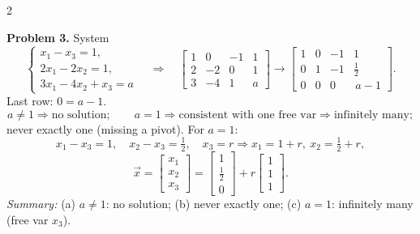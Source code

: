 \documentclass[8pt]{extarticle}
\begin{document}
\begin{multicols}{2}
\begin{tcolorbox}[title=Problems 2 and 3 — Explanations and Solutions, fontupper=\scriptsize]
\medskip
\textbf{Problem 3.}\; System
\[
\begin{cases}
x_1-x_3=1,\\
2x_1-2x_2=1,\\
3x_1-4x_2+x_3=a
\end{cases}
\quad\Longrightarrow\quad
\left[
\begin{array}{ccc|c}
1&0&-1&1\\
2&-2&0&1\\
3&-4&1&a
\end{array}
\right]
\to
\left[
\begin{array}{ccc|c}
1&0&-1&1\\
0&1&-1&\tfrac12\\
0&0&0&\,a-1
\end{array}
\right].
\]
Last row: \(0= a-1\).
\[
a\neq 1 \Rightarrow \text{no solution};\qquad
a=1 \Rightarrow \text{consistent with one free var} \Rightarrow \text{infinitely many};
\]
never exactly one (missing a pivot). For \(a=1\):
\[
x_1-x_3=1,\quad x_2-x_3=\tfrac12,\quad
x_3=r \Rightarrow x_1=1+r,\ x_2=\tfrac12+r,
\]
\[
\vec{x}=
\begin{bmatrix}x_1\\x_2\\x_3\end{bmatrix}
=
\begin{bmatrix}1\\[2pt]\tfrac12\\[2pt]0\end{bmatrix}
+r
\begin{bmatrix}1\\1\\1\end{bmatrix}.
\]
\textit{Summary:}\; (a) \(a\neq1\): no solution;\;
(b) never exactly one;\;
(c) \(a=1\): infinitely many (free var \(x_3\)).
\end{tcolorbox}


\end{multicols}
\end{document}
